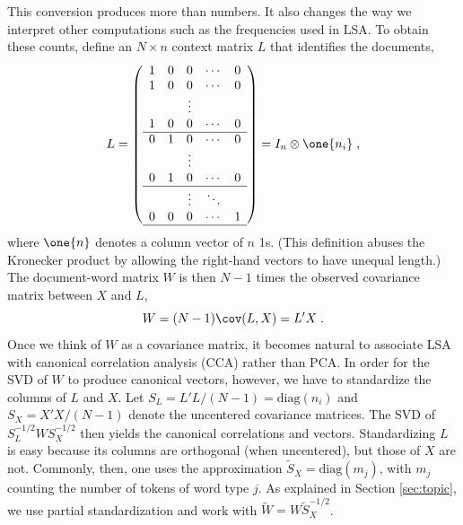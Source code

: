 \documentclass[12pt]{article}
\begin{document}
This conversion produces more than numbers.  It also changes the way we interpret other computations such as the frequencies used in LSA.  To obtain these counts, define an $N \times n$ context matrix $L$  that identifies the documents,
\begin{equation}
  L =  \left(  
           \begin{array}{ccccc}
            1  & 0 & 0 & \cdots & 0 \cr
            1  & 0 & 0 & \cdots & 0 \cr
             &&  \vdots &&                       \cr
            1 & 0 &  0 & \cdots & 0 \cr \hline
            0 & 1 & 0  & \cdots & 0 \cr
              &&  \vdots &&                        \cr
            0 & 1& 0 & \cdots & 0 \cr \hline
              &&  \vdots  &\ddots&             \cr
            0 & 0& 0 & \cdots & 1 \cr \hline        
           \end{array}
         \right) = I_n \otimes \one{n_i}  \;,
\end{equation}
where $\one{n}$ denotes a column vector of $n$ 1s. (This definition abuses the Kronecker product by allowing the right-hand vectors to have unequal length.)  The document-word matrix $W$ is then $N-1$ times the observed covariance matrix between $X$ and $L$,
\begin{equation*}
   W = (N-1) \cov(L,X) = L'X  \;.
\end{equation*}
Once we think of $W$ as a covariance matrix, it becomes natural to associate LSA with canonical correlation analysis (CCA) rather than PCA.  In order for the SVD of $W$ to produce canonical vectors, however, we have to standardize the columns of $L$ and $X$.  Let $S_L = L'L/(N-1) = \mbox{diag}(n_i)$ and $S_X = X'X/(N-1)$ denote the uncentered covariance matrices.    The SVD of $S_L^{-1/2} W S_X^{-1/2}$ then yields the canonical correlations and vectors.   Standardizing $L$ is easy because its columns are orthogonal (when uncentered), but those of $X$ are not.  Commonly, then, one uses the approximation $\widetilde{S}_X = \mbox{diag}(m_j)$, with $m_j$ counting the number of tokens of word type $j$.  As explained in Section \ref{sec:topic}, we use partial standardization and work with $\widetilde{W} =W \widetilde{S}_X^{-1/2}$.
\end{document}
